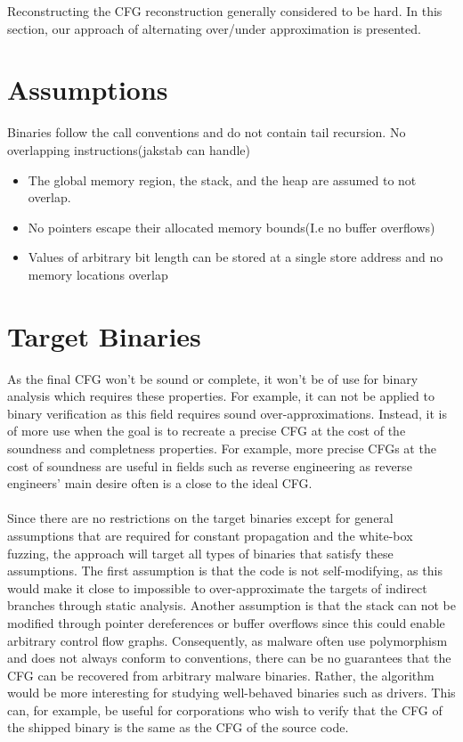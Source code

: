 \documentclass{kththesis}
\begin{document}
Reconstructing the CFG reconstruction generally considered to be hard\cite{Jakstab}. In this section, our approach of alternating over/under approximation is presented.

\section{Assumptions}
Binaries follow the call conventions and do not contain tail recursion.
No overlapping instructions(jakstab can handle)

\begin{itemize}
    \item The global memory region, the stack, and the heap are assumed to not overlap.
    \item No pointers escape their allocated memory bounds(I.e no buffer overflows)
    \item Values of arbitrary bit length can be stored at a single store address and no memory locations overlap
\end{itemize}

\section{Target Binaries}
As the final CFG won't be sound or complete, it won't be of use for binary analysis which requires these properties. For example, it can not be applied to binary verification as this field requires sound over-approximations. Instead, it is of more use when the goal is to recreate a precise CFG at the cost of the soundness and completness properties. For example, more precise CFGs at the cost of soundness are useful in fields such as reverse engineering as reverse engineers' main desire often is a close to the ideal CFG.
\\ \\
Since there are no restrictions on the target binaries except for general assumptions that are required for constant propagation and the white-box fuzzing, the approach will target all types of binaries that satisfy these assumptions. The first assumption is that the code is not self-modifying, as this would make it close to impossible to over-approximate the targets of indirect branches through static analysis. Another assumption is that the stack can not be modified through pointer dereferences or buffer overflows since this could enable arbitrary control flow graphs. Consequently, as malware often use polymorphism and does not always conform to conventions, there can be no guarantees that the CFG can be recovered from arbitrary malware binaries. Rather, the algorithm would be more interesting for studying well-behaved binaries such as drivers. This can, for example, be useful for corporations who wish to verify that the CFG of the shipped binary is the same as the CFG of the source code.
\end{document}
